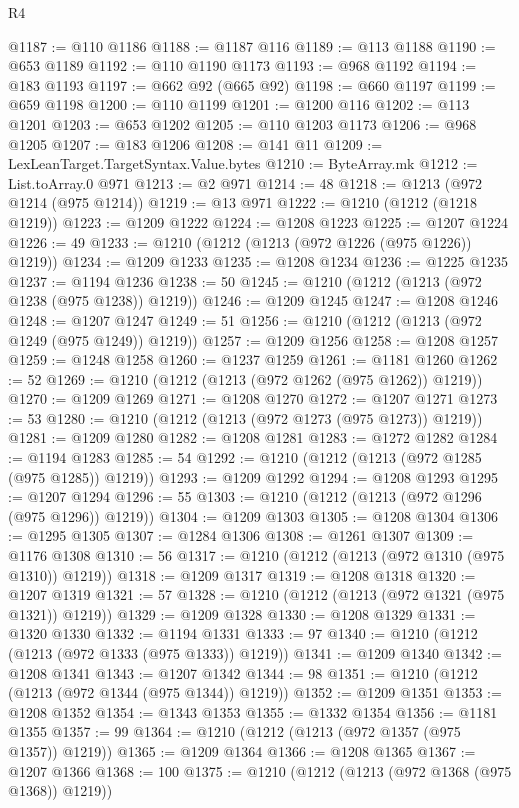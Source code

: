 \begin{lexlean}{R4}
\begin{coremodule}
@1187 := @110 @1186
@1188 := @1187 @116
@1189 := @113 @1188
@1190 := @653 @1189
@1192 := @110 @1190 @1173
@1193 := @968 @1192
@1194 := @183 @1193
@1197 := @662 @92 (@665 @92)
@1198 := @660 @1197
@1199 := @659 @1198
@1200 := @110 @1199
@1201 := @1200 @116
@1202 := @113 @1201
@1203 := @653 @1202
@1205 := @110 @1203 @1173
@1206 := @968 @1205
@1207 := @183 @1206
@1208 := @141 @11
@1209 := LexLeanTarget.TargetSyntax.Value.bytes
@1210 := ByteArray.mk
@1212 := List.toArray.{0} @971
@1213 := @2 @971
@1214 := 48
@1218 := @1213 (@972 @1214 (@975 @1214))
@1219 := @13 @971
@1222 := @1210 (@1212 (@1218 @1219))
@1223 := @1209 @1222
@1224 := @1208 @1223
@1225 := @1207 @1224
@1226 := 49
@1233 := @1210 (@1212 (@1213 (@972 @1226 (@975 @1226)) @1219))
@1234 := @1209 @1233
@1235 := @1208 @1234
@1236 := @1225 @1235
@1237 := @1194 @1236
@1238 := 50
@1245 := @1210 (@1212 (@1213 (@972 @1238 (@975 @1238)) @1219))
@1246 := @1209 @1245
@1247 := @1208 @1246
@1248 := @1207 @1247
@1249 := 51
@1256 := @1210 (@1212 (@1213 (@972 @1249 (@975 @1249)) @1219))
@1257 := @1209 @1256
@1258 := @1208 @1257
@1259 := @1248 @1258
@1260 := @1237 @1259
@1261 := @1181 @1260
@1262 := 52
@1269 := @1210 (@1212 (@1213 (@972 @1262 (@975 @1262)) @1219))
@1270 := @1209 @1269
@1271 := @1208 @1270
@1272 := @1207 @1271
@1273 := 53
@1280 := @1210 (@1212 (@1213 (@972 @1273 (@975 @1273)) @1219))
@1281 := @1209 @1280
@1282 := @1208 @1281
@1283 := @1272 @1282
@1284 := @1194 @1283
@1285 := 54
@1292 := @1210 (@1212 (@1213 (@972 @1285 (@975 @1285)) @1219))
@1293 := @1209 @1292
@1294 := @1208 @1293
@1295 := @1207 @1294
@1296 := 55
@1303 := @1210 (@1212 (@1213 (@972 @1296 (@975 @1296)) @1219))
@1304 := @1209 @1303
@1305 := @1208 @1304
@1306 := @1295 @1305
@1307 := @1284 @1306
@1308 := @1261 @1307
@1309 := @1176 @1308
@1310 := 56
@1317 := @1210 (@1212 (@1213 (@972 @1310 (@975 @1310)) @1219))
@1318 := @1209 @1317
@1319 := @1208 @1318
@1320 := @1207 @1319
@1321 := 57
@1328 := @1210 (@1212 (@1213 (@972 @1321 (@975 @1321)) @1219))
@1329 := @1209 @1328
@1330 := @1208 @1329
@1331 := @1320 @1330
@1332 := @1194 @1331
@1333 := 97
@1340 := @1210 (@1212 (@1213 (@972 @1333 (@975 @1333)) @1219))
@1341 := @1209 @1340
@1342 := @1208 @1341
@1343 := @1207 @1342
@1344 := 98
@1351 := @1210 (@1212 (@1213 (@972 @1344 (@975 @1344)) @1219))
@1352 := @1209 @1351
@1353 := @1208 @1352
@1354 := @1343 @1353
@1355 := @1332 @1354
@1356 := @1181 @1355
@1357 := 99
@1364 := @1210 (@1212 (@1213 (@972 @1357 (@975 @1357)) @1219))
@1365 := @1209 @1364
@1366 := @1208 @1365
@1367 := @1207 @1366
@1368 := 100
@1375 := @1210 (@1212 (@1213 (@972 @1368 (@975 @1368)) @1219))

\end{coremodule}
\end{lexlean}
